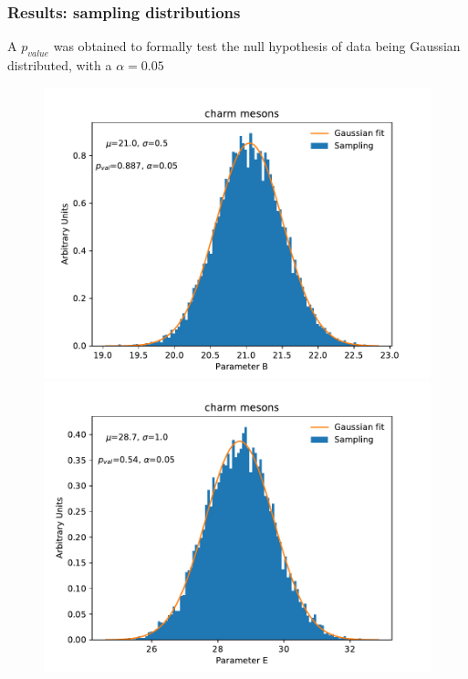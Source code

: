 \documentclass[10pt]{beamer}
\begin{document}
\begin{frame}
\frametitle{Results: sampling distributions}
\scriptsize{A $p_{value}$ was obtained to formally test the null hypothesis of data being Gaussian distributed, with a $\alpha = 0.05$}
\begin{figure}
   \includegraphics[scale=0.325]{./Plots/charm_bootstrap_b_All.pdf}
   \includegraphics[scale=0.325]{./Plots/charm_bootstrap_e_All.pdf}   
\end{figure}

\end{frame}
\end{document}
